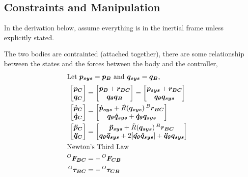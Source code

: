 \subsection{Constraints and Manipulation}
In the derivation below, assume everything is in the inertial frame unless explicitly stated. \par
The two bodies are contrainted (attached together), there are some relationship between the states and the forces between the body and the controller, 
\begin{align}
  \intertext{Let $\bm{p_{sys}} = \bm{p_B}$ and $\bm{q_{sys}} = \bm{q_{B}}$,}
  \begin{bmatrix}
    \bm{p_C} \\
    \bm{q_C}
  \end{bmatrix} &=
  \begin{bmatrix}
    \bm{p_B} + \bm{r_{BC}} \\
    \bm{q_{\theta}}\bm{q_B}
  \end{bmatrix}
  =
  \begin{bmatrix}
    \bm{p_{sys}} + \bm{r_{BC}} \\
    \bm{q_{\theta}}\bm{q_{sys}}
\end{bmatrix}  \\
  \begin{bmatrix}
    \bm{\dot{p}_C} \\
    \bm{\dot{q}_C}
  \end{bmatrix} &=
  \begin{bmatrix}
    \bm{\dot{p}_{sys}} + \dot{R}(\bm{q_{sys}})\prescript{B}{}{\bm{r_{BC}}} \\
    \bm{q_{\theta}}\bm{\dot{q}_{sys}} + \bm{\dot{q}_{\theta}}\bm{q_{sys}} 
\end{bmatrix} \\
  \begin{bmatrix}
    \bm{\ddot{p}_C} \\
    \bm{\ddot{q}_C}
  \end{bmatrix} &=
  \begin{bmatrix}
    \bm{\ddot{p}_{sys}} + \ddot{R}(\bm{q_{sys}})\prescript{B}{}{\bm{r_{BC}}} \\
    \bm{q_{\theta}}\bm{\ddot{q}_{sys}} + 2[\bm{\dot{q_\theta}} \bm{\dot{q}_{sys}}] + \bm{\ddot{q}_{\theta}}\bm{q_{sys}} 
  \end{bmatrix} \\   
  \intertext{Newton's Third Law}
  \prescript{O}{}{\bm{F_{BC}}} &= -\prescript{O}{}{\bm{F_{CB}}} \\
  \prescript{O}{}{\bm{\tau_{BC}}} &= -\prescript{O}{}{\bm{\tau_{CB}}}
\end{align}
